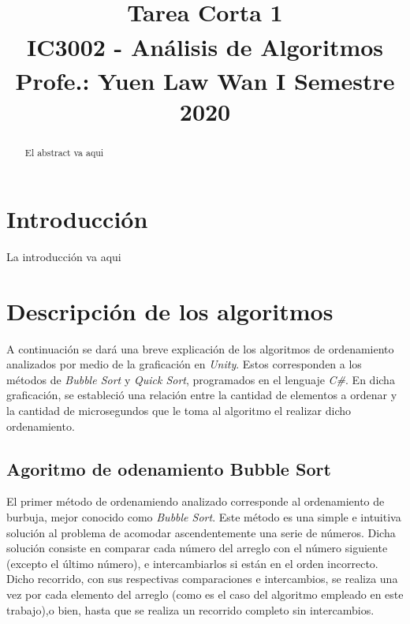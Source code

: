 \documentclass[conference]{IEEEtran}
\begin{document}
\title{Tarea Corta 1\\
{\footnotesize \textsuperscript{}IC3002 - Análisis de Algoritmos}
{\footnotesize \textsuperscript{}Profe.: Yuen Law Wan}
{\footnotesize \textsuperscript{}I Semestre 2020}
}

\author{
\and
{}
}

\maketitle

\begin{abstract}
El abstract va aqui
\end{abstract}


\section{Introducción}
La introducción va aqui\\

\section{Descripción de los algoritmos}
A continuación se dará una breve explicación de los algoritmos de ordenamiento analizados por medio
de la graficación en \textit{Unity}. Estos corresponden a los métodos de \textit{Bubble Sort} y \textit{Quick Sort}, programados
en el lenguaje \textit{C\#}. En dicha graficación, se estableció una relación entre la cantidad de elementos a ordenar y
 la cantidad de microsegundos que le toma al algoritmo el realizar dicho ordenamiento. 


\subsection{Agoritmo de odenamiento Bubble Sort}

El primer método de ordenamiendo analizado corresponde al ordenamiento de burbuja, mejor conocido como \textit{Bubble Sort}.
Este método es una simple e intuitiva solución al problema de acomodar ascendentemente una serie de números. 
Dicha solución consiste en comparar cada número del arreglo con el número siguiente
 (excepto el último número), e intercambiarlos si están en el orden incorrecto. Dicho recorrido, con 
sus respectivas comparaciones e intercambios, se realiza una vez por cada elemento del arreglo
 (como es el caso del algoritmo empleado en este trabajo),o bien, hasta que se realiza un recorrido completo sin intercambios.
\end{document}
